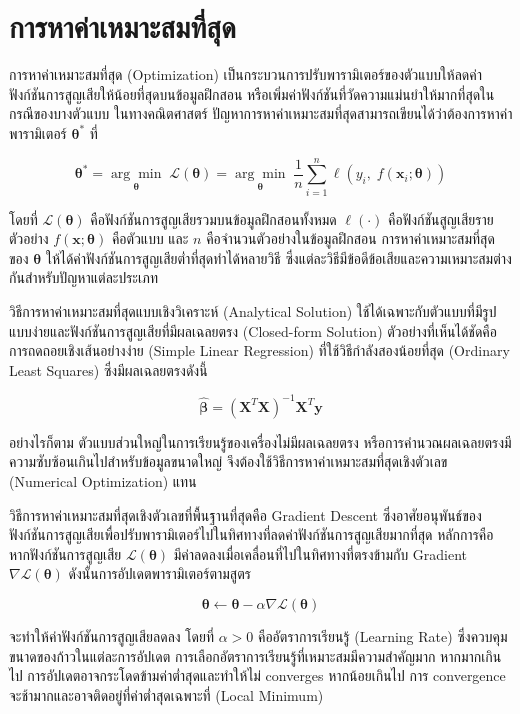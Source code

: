 \section{การหาค่าเหมาะสมที่สุด}
การหาค่าเหมาะสมที่สุด (Optimization) เป็นกระบวนการปรับพารามิเตอร์ของตัวแบบให้ลดค่าฟังก์ชันการสูญเสียให้น้อยที่สุดบนข้อมูลฝึกสอน หรือเพิ่มค่าฟังก์ชันที่วัดความแม่นยำให้มากที่สุดในกรณีของบางตัวแบบ ในทางคณิตศาสตร์ ปัญหาการหาค่าเหมาะสมที่สุดสามารถเขียนได้ว่าต้องการหาค่าพารามิเตอร์ $\boldsymbol{\theta}^{*}$ ที่

\[
\boldsymbol{\theta}^{*} = \underset{\boldsymbol{\theta}}{\arg\min} \; \mathcal{L}(\boldsymbol{\theta}) = \underset{\boldsymbol{\theta}}{\arg\min} \; \frac{1}{n}\sum_{i=1}^{n}\ell\!\left(y_i,\; f(\mathbf{x}_i; \boldsymbol{\theta})\right)
\]

โดยที่ $\mathcal{L}(\boldsymbol{\theta})$ คือฟังก์ชันการสูญเสียรวมบนข้อมูลฝึกสอนทั้งหมด $\ell(\cdot)$ คือฟังก์ชันสูญเสียรายตัวอย่าง $f(\mathbf{x}; \boldsymbol{\theta})$ คือตัวแบบ และ $n$ คือจำนวนตัวอย่างในข้อมูลฝึกสอน การหาค่าเหมาะสมที่สุดของ $\boldsymbol{\theta}$ ให้ได้ค่าฟังก์ชันการสูญเสียต่ำที่สุดทำได้หลายวิธี ซึ่งแต่ละวิธีมีข้อดีข้อเสียและความเหมาะสมต่างกันสำหรับปัญหาแต่ละประเภท

วิธีการหาค่าเหมาะสมที่สุดแบบเชิงวิเคราะห์ (Analytical Solution) ใช้ได้เฉพาะกับตัวแบบที่มีรูปแบบง่ายและฟังก์ชันการสูญเสียที่มีผลเฉลยตรง (Closed-form Solution) ตัวอย่างที่เห็นได้ชัดคือการถดถอยเชิงเส้นอย่างง่าย (Simple Linear Regression) ที่ใช้วิธีกำลังสองน้อยที่สุด (Ordinary Least Squares) ซึ่งมีผลเฉลยตรงดังนี้

\[
\boldsymbol{\hat{\beta}} = (\mathbf{X}^{T}\mathbf{X})^{-1}\mathbf{X}^{T}\mathbf{y}
\]

อย่างไรก็ตาม ตัวแบบส่วนใหญ่ในการเรียนรู้ของเครื่องไม่มีผลเฉลยตรง หรือการคำนวณผลเฉลยตรงมีความซับซ้อนเกินไปสำหรับข้อมูลขนาดใหญ่ จึงต้องใช้วิธีการหาค่าเหมาะสมที่สุดเชิงตัวเลข (Numerical Optimization) แทน

วิธีการหาค่าเหมาะสมที่สุดเชิงตัวเลขที่พื้นฐานที่สุดคือ Gradient Descent ซึ่งอาศัยอนุพันธ์ของฟังก์ชันการสูญเสียเพื่อปรับพารามิเตอร์ไปในทิศทางที่ลดค่าฟังก์ชันการสูญเสียมากที่สุด หลักการคือ หากฟังก์ชันการสูญเสีย $\mathcal{L}(\boldsymbol{\theta})$ มีค่าลดลงเมื่อเคลื่อนที่ไปในทิศทางที่ตรงข้ามกับ Gradient $\nabla\mathcal{L}(\boldsymbol{\theta})$ ดังนั้นการอัปเดตพารามิเตอร์ตามสูตร

\[
\boldsymbol{\theta} \leftarrow \boldsymbol{\theta} - \alpha \nabla\mathcal{L}(\boldsymbol{\theta})
\]

จะทำให้ค่าฟังก์ชันการสูญเสียลดลง โดยที่ $\alpha > 0$ คืออัตราการเรียนรู้ (Learning Rate) ซึ่งควบคุมขนาดของก้าวในแต่ละการอัปเดต การเลือกอัตราการเรียนรู้ที่เหมาะสมมีความสำคัญมาก หากมากเกินไป การอัปเดตอาจกระโดดข้ามค่าต่ำสุดและทำให้ไม่ converges หากน้อยเกินไป การ convergence จะช้ามากและอาจติดอยู่ที่ค่าต่ำสุดเฉพาะที่ (Local Minimum)

